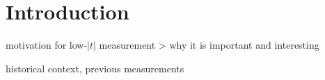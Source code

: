 \section{Introduction}
\label{sec:cni_intro}

\> motivation for low-$|t|$ measurement
\>> why it is important and interesting

\> historical context, previous measurements

